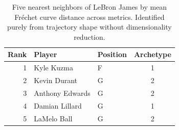 \begin{table}[htbp]
  \centering\small
  \begin{tabular}{rllc}
    \toprule
    Rank & Player & Position & Archetype \\
    \midrule
    1 & Kyle Kuzma & F & 1 \\
    2 & Kevin Durant & G & 2 \\
    3 & Anthony Edwards & G & 2 \\
    4 & Damian Lillard & G & 1 \\
    5 & LaMelo Ball & G & 2 \\
    \bottomrule
  \end{tabular}
  \caption{Five nearest neighbors of LeBron James by mean Fr\'{e}chet curve distance across metrics. Identified purely from trajectory shape without dimensionality reduction.}
  \label{tab:LeBron_James_frechet_curve_neighbors}
\end{table}

